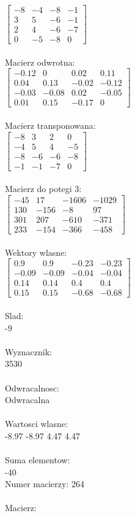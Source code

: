 \documentclass[a4paper,12pt]{article}
\begin{document}
$\begin{bmatrix} -8&-4&-8&-1\\3&5&-6&-1\\2&4&-6&-7\\0&-5&-8&0 \end{bmatrix}$
\\
\\
Macierz odwrotna:\\

$\begin{bmatrix} -0.12&0&0.02&0.11\\0.04&0.13&-0.02&-0.12\\-0.03&-0.08&0.02&-0.05\\0.01&0.15&-0.17&0 \end{bmatrix}$
\\
\\
Macierz transponowana:\\

$\begin{bmatrix} -8&3&2&0\\-4&5&4&-5\\-8&-6&-6&-8\\-1&-1&-7&0 \end{bmatrix}$
\\
\\
Macierz do potegi 3:\\

$\begin{bmatrix} -45&17&-1606&-1029\\130&-156&-8&97\\301&207&-610&-371\\233&-154&-366&-458 \end{bmatrix}$
\\
\\
Wektory wlasne:\\

$\begin{bmatrix} 0.9&0.9&-0.23&-0.23\\-0.09&-0.09&-0.04&-0.04\\0.14&0.14&0.4&0.4\\0.15&0.15&-0.68&-0.68 \end{bmatrix}$
\\
\\
Slad:\\
-9
\\
\\
Wyznacznik:\\
3530
\\
\\
Odwracalnosc:\\
Odwracalna
\\
\\
Wartosci wlasne:\\
-8.97 -8.97 4.47 4.47
\\
\\
Suma elementow:\\
-40
\\
\newpage
Numer macierzy:
264
\\
\\
Macierz:\\
\end{document}
